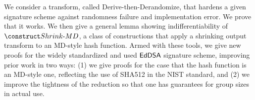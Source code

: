 We consider a transform, called Derive-then-Derandomize, that hardens a given
signature scheme against randomness failure and implementation error.
We prove that it works. We then give a general lemma showing indifferentiability of $\ShrinkMD$, a class of constructions that apply a shrinking output transform to an MD-style hash function.
Armed with these tools, we give new
proofs for the widely standardized
and used $\mathsf{EdDSA}$ signature scheme, improving prior work in two ways:
(1) we give proofs for the case that the hash function is an MD-style one,
reflecting the use of SHA512 in the NIST standard, and (2)
we improve the tightness of the reduction so that one has guarantees for group
sizes in actual use. 

